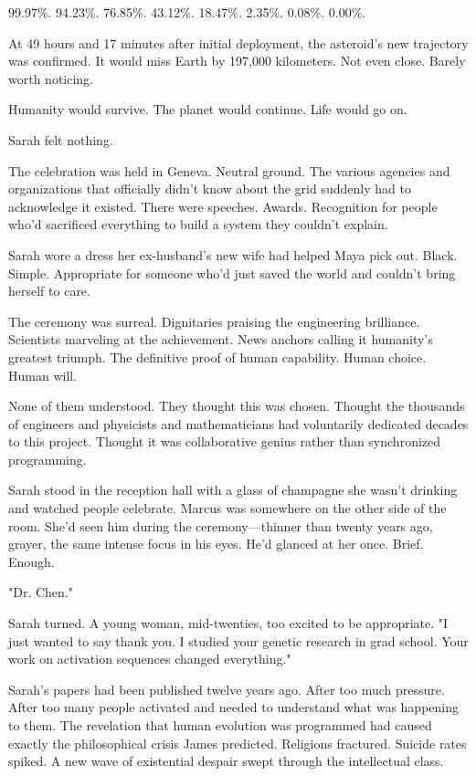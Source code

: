 99.97\%.
94.23\%.
76.85\%.
43.12\%.
18.47\%.
2.35\%.
0.08\%.
0.00\%.

At 49 hours and 17 minutes after initial deployment, the asteroid's new trajectory was confirmed. It would miss Earth by 197,000 kilometers. Not even close. Barely worth noticing.

Humanity would survive. The planet would continue. Life would go on.

Sarah felt nothing.

\scenebreak

The celebration was held in Geneva. Neutral ground. The various agencies and organizations that officially didn't know about the grid suddenly had to acknowledge it existed. There were speeches. Awards. Recognition for people who'd sacrificed everything to build a system they couldn't explain.

Sarah wore a dress her ex-husband's new wife had helped Maya pick out. Black. Simple. Appropriate for someone who'd just saved the world and couldn't bring herself to care.

The ceremony was surreal. Dignitaries praising the engineering brilliance. Scientists marveling at the achievement. News anchors calling it humanity's greatest triumph. The definitive proof of human capability. Human choice. Human will.

None of them understood. They thought this was chosen. Thought the thousands of engineers and physicists and mathematicians had voluntarily dedicated decades to this project. Thought it was collaborative genius rather than synchronized programming.

Sarah stood in the reception hall with a glass of champagne she wasn't drinking and watched people celebrate. Marcus was somewhere on the other side of the room. She'd seen him during the ceremony—thinner than twenty years ago, grayer, the same intense focus in his eyes. He'd glanced at her once. Brief. Enough.

"Dr. Chen."

Sarah turned. A young woman, mid-twenties, too excited to be appropriate. "I just wanted to say thank you. I studied your genetic research in grad school. Your work on activation sequences changed everything."

Sarah's papers had been published twelve years ago. After too much pressure. After too many people activated and needed to understand what was happening to them. The revelation that human evolution was programmed had caused exactly the philosophical crisis James predicted. Religions fractured. Suicide rates spiked. A new wave of existential despair swept through the intellectual class.

